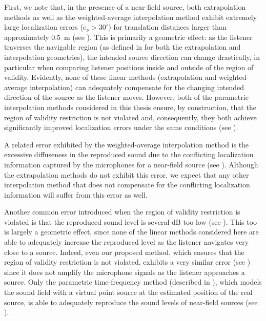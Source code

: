 First, we note that, in the presence of a near-field source, both extrapolation methods as well as the weighted-average interpolation method exhibit extremely large localization errors ($e_\nu > 30^\circ$) for translation distances larger than approximately $0.5$~m (see ).
This is primarily a geometric effect: as the listener traverses the navigable region (as defined in  for both the extrapolation and interpolation geometries), the intended source direction can change drastically, in particular when comparing listener positions inside and outside of the region of validity.
Evidently, none of these linear methods (extrapolation and weighted-average interpolation) can adequately compensate for the changing intended direction of the source as the listener moves.
However, both of the parametric interpolation methods considered in this thesis ensure, by construction, that the region of validity restriction is not violated and, consequently, they both achieve significantly improved localization errors under the same conditions (see ).

A related error exhibited by the weighted-average interpolation method is the excessive diffuseness in the reproduced sound due to the conflicting localization information captured by the microphones for a near-field source (see ).
Although the extrapolation methods do not exhibit this error, we expect that any other interpolation method that does not compensate for the conflicting localization information will suffer from this error as well.

Another common error introduced when the region of validity restriction is violated is that the reproduced sound level is several dB too low (see ).
This too is largely a geometric effect, since none of the linear methods considered here are able to adequately increase the reproduced level as the listener navigates very close to a source.
Indeed, even our proposed method, which ensures that the region of validity restriction is not violated, exhibits a very similar error (see ) since it does not amplify the microphone signals as the listener approaches a source.
Only the parametric time-frequency method (described in ), which models the sound field with a virtual point source at the estimated position of the real source, is able to adequately reproduce the sound levels of near-field sources (see ).

